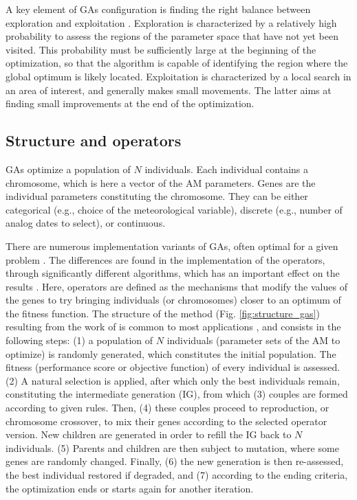 \documentclass{ametsoc}
\begin{document}
A key element of GAs configuration is finding the right balance between exploration and exploitation \citep{Back1992a, Smith1997a}. Exploration is characterized by a relatively high probability to assess the regions of the parameter space that have not yet been visited. This probability must be sufficiently large at the beginning of the optimization, so that the algorithm is capable of identifying the region where the global optimum is likely located. Exploitation is characterized by a local search in an area of interest, and generally makes small movements. The latter aims at finding small improvements at the end of the optimization.


\subsection{Structure and operators}
\label{sec:gas:operators}

GAs optimize a population of $N$ individuals. Each individual contains a chromosome, which is here a vector of the AM parameters. Genes are the individual parameters constituting the chromosome. They can be either categorical (e.g., choice of the meteorological variable), discrete (e.g., number of analog dates to select), or continuous.

There are numerous implementation variants of GAs, often optimal for a given problem \citep{Hart1991a, Schraudolph1992a}. The differences are found in the implementation of the operators, through significantly different algorithms, which has an important effect on the results \citep{Gaffney2010a}. Here, operators are defined as the mechanisms that modify the values of the genes to try bringing individuals (or chromosomes) closer to an optimum of the fitness function. The structure of the method (Fig. \ref{fig:structure_gas}) resulting from the work of \citet{Holland1992b} is common to most applications \citep{Back1993b}, and consists in the following steps: (1) a population of $N$ individuals (parameter sets of the AM to optimize) is randomly generated, which constitutes the initial population. The fitness (performance score or objective function) of every individual is assessed. (2) A natural selection is applied, after which only the best individuals remain, constituting the intermediate generation (IG), from which (3) couples are formed according to given rules. Then, (4) these couples proceed to reproduction, or chromosome crossover, to mix their genes according to the selected operator version. New children are generated in order to refill the IG back to $N$ individuals. (5) Parents and children are then subject to mutation, where some genes are randomly changed. Finally, (6) the new generation is then re-assessed, the best individual restored if degraded, and (7) according to the ending criteria, the optimization ends or starts again for another iteration.
\end{document}
